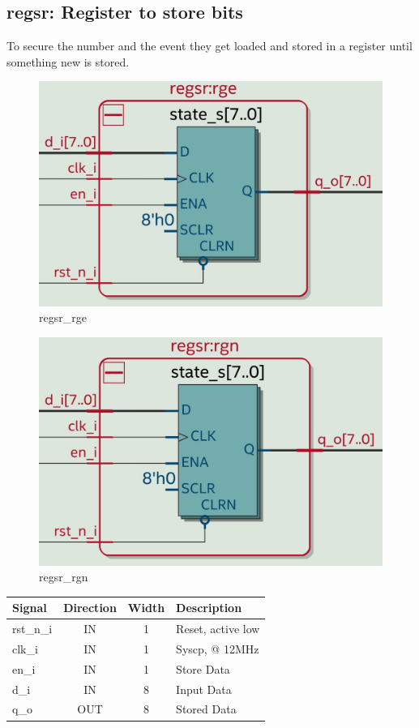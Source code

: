 \documentclass[12pt,a4 paper] {report}
\begin{document}
\newpage

\subsection{regsr: Register to store bits}
To secure the number and the event they get loaded and stored in a register until something new is stored.
\begin{figure}[h]
	\centering	
	\includegraphics[scale=0.12]{../png/regsr_rge.png}
	\caption{regsr\_rge}
\end{figure}
\begin{figure}[h]
	\centering	
	\includegraphics[scale=0.12]{../png/regsr_rgn.png}
	\caption{regsr\_rgn}
\end{figure}
\begin{center}
	\begin{tabular}{ | p{2cm} | c | c | p{5cm} |}
		\hline
		\textbf{Signal} & \textbf{Direction} & \textbf{Width} & \textbf{Description} \\
		\hline	
 		rst\_n\_i & IN & 1 & Reset, active low \\
 		\hline
		clk\_i & IN & 1 & Syscp, @ 12MHz \\
		\hline
		en\_i & IN & 1 & Store Data \\
		\hline
		d\_i & IN & 8 & Input Data \\
		\hline
		q\_o & OUT & 8 & Stored Data \\
		\hline
	\end{tabular}
\end{center}
\end{document}
